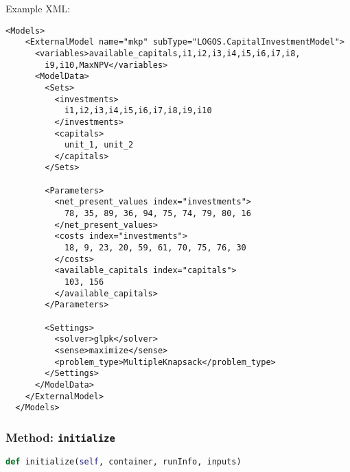 Example XML:
\begin{lstlisting}[style=XML,morekeywords={subType,ModuleToLoad}]
  <Models>
    <ExternalModel name="mkp" subType="LOGOS.CapitalInvestmentModel">
      <variables>available_capitals,i1,i2,i3,i4,i5,i6,i7,i8,
        i9,i10,MaxNPV</variables>
      <ModelData>
        <Sets>
          <investments>
            i1,i2,i3,i4,i5,i6,i7,i8,i9,i10
          </investments>
          <capitals>
            unit_1, unit_2
          </capitals>
        </Sets>

        <Parameters>
          <net_present_values index="investments">
            78, 35, 89, 36, 94, 75, 74, 79, 80, 16
          </net_present_values>
          <costs index="investments">
            18, 9, 23, 20, 59, 61, 70, 75, 76, 30
          </costs>
          <available_capitals index="capitals">
            103, 156
          </available_capitals>
        </Parameters>

        <Settings>
          <solver>glpk</solver>
          <sense>maximize</sense>
          <problem_type>MultipleKnapsack</problem_type>
        </Settings>
      </ModelData>
    </ExternalModel>
  </Models>
\end{lstlisting}

\subsubsection{Method: \texttt{initialize}}
\label{subsubsec:externalInitializeExternalModelPlugin}
\begin{lstlisting}[language=python]
def initialize(self, container, runInfo, inputs)
\end{lstlisting}


